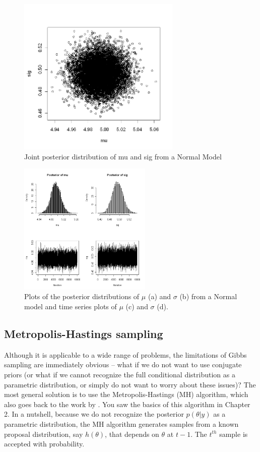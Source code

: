 \begin{figure}
\begin{center}
\includegraphics[height=3in]{Ch6/figs/postdist}
\end{center}
\caption{Joint posterior distribution of mu and sig from a Normal Model}
\label{postdist.fig}
\end{figure}

\begin{figure}
\begin{center}
\includegraphics[width=2.5in]{Ch6/figs/plotsofPD}
\end{center}
\caption{Plots of the posterior distributions of $\mu$ (a) and $\sigma$ (b)
  from a Normal model and time series plots of $\mu$ (c) and $\sigma$ (d).}
\label{plotsofPD.fig}
\end{figure}

\subsection{ Metropolis-Hastings sampling   }

Although it is applicable to a wide range of problems, the limitations
of Gibbs sampling are immediately obvious – what if we do not want to
use conjugate priors (or what if we cannot recognize the full
conditional distribution as a parametric distribution, or simply do
not want to worry about these issues)? The most general solution is to
use the Metropolis-Hastings (MH) algorithm, which also goes back to
the work by \citet{metropolis_ulam:1953}. You saw the basics of this
algorithm in Chapter 2. In a nutshell, because we do not recognize the
posterior $p(\theta|y)$ as a parametric distribution, the MH algorithm
generates samples from a known proposal distribution, say $h(\theta)$,
that depends on $\theta$ at $t-1$. The $t^{th}$ sample is accepted with probability. 

